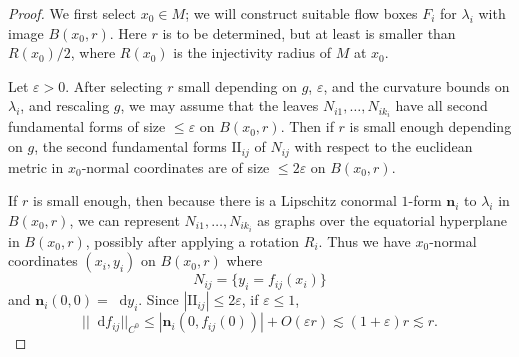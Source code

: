 \documentclass[reqno,11pt]{amsart}
\newcommand*\dif{\mathop{}\!\mathrm{d}}
\newcommand{\Two}{\mathrm{I\!I}}
\newcommand{\normal}{\mathbf n}
\theoremstyle{definition}
\numberwithin{equation}{section}
\begin{document}
\begin{proof}
We first select $x_0 \in M$; we will construct suitable flow boxes $F_i$ for $\lambda_i$ with image $B(x_0, r)$.
Here $r$ is to be determined, but at least is smaller than $R(x_0)/2$, where $R(x_0)$ is the injectivity radius of $M$ at $x_0$.

Let $\varepsilon > 0$.
After selecting $r$ small depending on $g$, $\varepsilon$, and the curvature bounds on $\lambda_i$, and rescaling $g$, we may assume that the leaves $N_{i1}, \dots, N_{ik_i}$ have all second fundamental forms of size $\leq \varepsilon$ on $B(x_0, r)$.
Then if $r$ is small enough depending on $g$, the second fundamental forms $\Two_{ij}$ of $N_{ij}$ with respect to the euclidean metric in $x_0$-normal coordinates are of size $\leq 2\varepsilon$ on $B(x_0, r)$.

If $r$ is small enough, then because there is a Lipschitz conormal $1$-form $\normal_i$ to $\lambda_i$ in $B(x_0, r)$, we can represent $N_{i1}, \dots, N_{ik_i}$ as graphs over the equatorial hyperplane in $B(x_0, r)$, possibly after applying a rotation $R_i$.
Thus we have $x_0$-normal coordinates $(x_i, y_i)$ on $B(x_0, r)$ where
$$N_{ij} = \{y_i = f_{ij}(x_i)\}$$
and $\normal_i(0, 0) = \dif y_i$.
Since $|\Two_{ij}| \leq 2\varepsilon$, if $\varepsilon \leq 1$,
\begin{equation}\label{bound on derivatives}
||\dif f_{ij}||_{C^0} \leq |\normal_i(0, f_{ij}(0))| + O(\varepsilon r) \lesssim (1 + \varepsilon) r \lesssim r.
\end{equation}


\end{proof}
\end{document}
